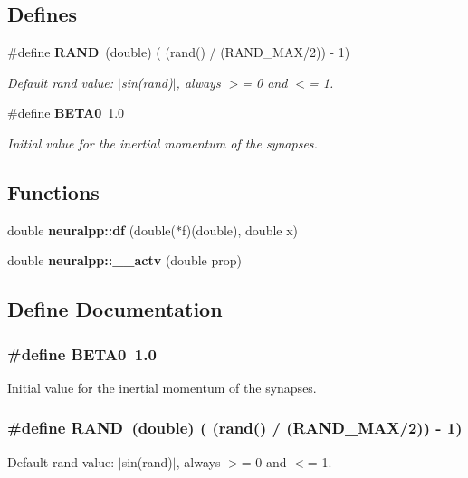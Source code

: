\subsection*{Defines}
\begin{CompactItemize}
\item 
\#define {\bf RAND}~(double) ( (rand() / (RAND\_\-MAX/2)) - 1)
\begin{CompactList}\small\item\em Default rand value: $|$sin(rand)$|$, always $>$= 0 and $<$= 1. \item\end{CompactList}\item 
\#define {\bf BETA0}~1.0
\begin{CompactList}\small\item\em Initial value for the inertial momentum of the synapses. \item\end{CompactList}\end{CompactItemize}
\subsection*{Functions}
\begin{CompactItemize}
\item 
double {\bf neuralpp::df} (double($\ast$f)(double), double x)
\item 
double {\bf neuralpp::\_\-\_\-actv} (double prop)
\end{CompactItemize}


\subsection{Define Documentation}
\subsubsection[BETA0]{\setlength{\rightskip}{0pt plus 5cm}\#define BETA0~1.0}\label{neural_09_09_8hpp_05e2bb5b9fc32f0b6b4d84fe43177d72}


Initial value for the inertial momentum of the synapses. 

\subsubsection[RAND]{\setlength{\rightskip}{0pt plus 5cm}\#define RAND~(double) ( (rand() / (RAND\_\-MAX/2)) - 1)}\label{neural_09_09_8hpp_839a9222721835f53c5b248241f535f4}


Default rand value: $|$sin(rand)$|$, always $>$= 0 and $<$= 1. 

